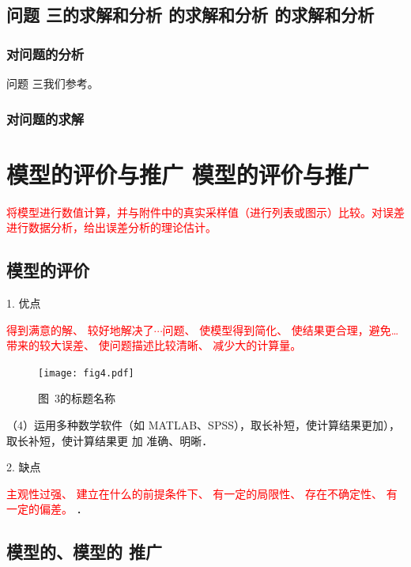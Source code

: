 \documentclass[12pt,a4paper]{mcmthesis}
\begin{document}
    \subsection{问题 三的求解和分析 的求解和分析 的求解和分析}

    \subsubsection{对问题的分析}

    问题 三我们参考\cite{错峰出行}。

    \subsubsection{对问题的求解}


    \section{模型的评价与推广 模型的评价与推广}

    \textcolor{red}{将模型进行数值计算，并与附件中的真实采样值（进行列表或图示）比较。对误差进行数据分析，给出误差分析的理论估计。}

    \subsection{模型的评价}


    1. 优点

    \textcolor{red}{得到满意的解、
    较好地解决了$\cdots$问题、
    使模型得到简化、
    使结果更合理，避免…带来的较大误差、
    使问题描述比较清晰、
    减少大的计算量。}



    \begin{figure}[h!t]
        \centerline{\texttt{[image: fig4.pdf]}}
        \caption{\song\wuhao 图~3的标题名称}
    \end{figure}


    （4）运用多种数学软件（如 MATLAB、SPSS），取长补短，使计算结果更加），取长补短，使计算结果更
    加 准确、明晰．

    2. 缺点

    \textcolor{red}{主观性过强、
    建立在什么的前提条件下、
    有一定的局限性、
    存在不确定性、
    有一定的偏差。
    }
    ．

    \subsection{模型的、模型的 推广}
\end{document}
